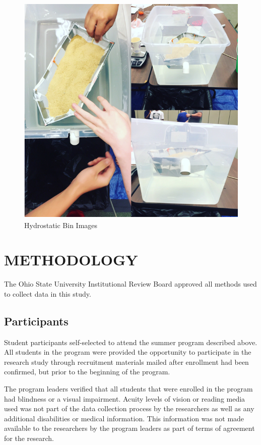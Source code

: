 \documentclass[11.5pt]{sig-alternate} %
\begin{document}
\begin{large}
\begin{figure}[!h]
    \centering
    \includegraphics[width=1\linewidth]{fig3.png}
    \caption{Hydrostatic Bin Images}
\end{figure}

\newpage

\section*{METHODOLOGY}

The Ohio State University Institutional Review Board approved all methods used to collect data in this study.  

\subsection*{Participants}

Student participants self-selected to attend the summer program described above. All students in the program were provided the opportunity to participate in the research study through recruitment materials mailed after enrollment had been confirmed, but prior to the beginning of the program.  

The program leaders verified that all students that were enrolled in the program had blindness or a visual impairment. Acuity levels of vision or reading media used was not part of the data collection process by the researchers as well as any additional disabilities or medical information. This information was not made available to the researchers by the program leaders as part of terms of agreement for the research.      


\end{large}
\end{document}
